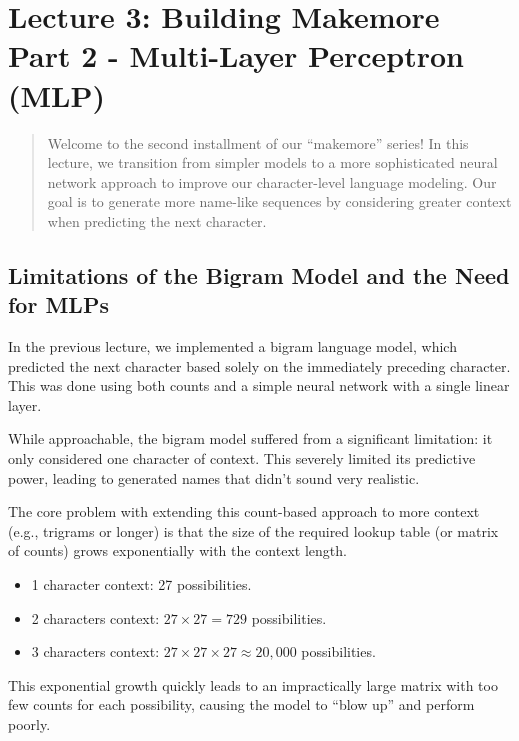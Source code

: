 
\section{Lecture 3: Building Makemore Part 2 - Multi-Layer Perceptron (MLP)}

\begin{abstract}
Welcome to the second installment of our ``makemore'' series! In this lecture, we transition from simpler models to a more sophisticated neural network approach to improve our character-level language modeling. Our goal is to generate more name-like sequences by considering greater context when predicting the next character.
\end{abstract}

\subsection{Limitations of the Bigram Model and the Need for MLPs}

In the previous lecture, we implemented a bigram language model, which predicted the next character based solely on the immediately preceding character. This was done using both counts and a simple neural network with a single linear layer.

While approachable, the bigram model suffered from a significant limitation: it only considered one character of context. This severely limited its predictive power, leading to generated names that didn't sound very realistic.

The core problem with extending this count-based approach to more context (e.g., trigrams or longer) is that the size of the required lookup table (or matrix of counts) grows exponentially with the context length.
\begin{itemize}
    \item 1 character context: 27 possibilities.
    \item 2 characters context: $27 \times 27 = 729$ possibilities.
    \item 3 characters context: $27 \times 27 \times 27 \approx 20,000$ possibilities.
\end{itemize}

This exponential growth quickly leads to an impractically large matrix with too few counts for each possibility, causing the model to ``blow up'' and perform poorly.

